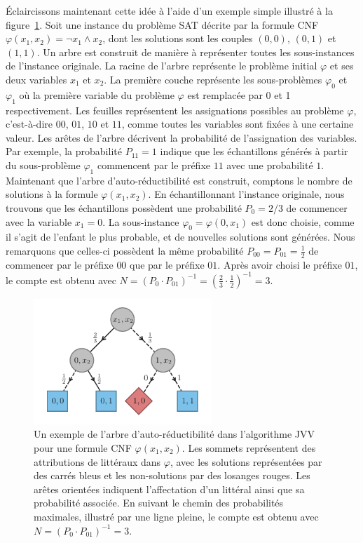 Éclaircissons maintenant cette idée à l'aide d'un exemple simple illustré à la figure~\ref{fig:algorithme-jvv}. Soit une instance du problème SAT décrite par la formule CNF $\varphi(x_{1}, x_{2}) = \neg x_{1} \land x_{2}$, dont les solutions sont les couples $(0,0)$, $(0,1)$ et $(1,1)$. Un arbre est construit de manière à représenter toutes les sous-instances de l'instance originale. La racine de l'arbre représente le problème initial $\varphi$ et ses deux variables $x_{1}$ et $x_{2}$. La première couche représente les sous-problèmes $\varphi_{0}$ et $\varphi_{1}$ où la première variable du problème $\varphi$ est remplacée par 0 et 1 respectivement. Les feuilles représentent les assignations possibles au problème $\varphi$, c'est-à-dire $00$, $01$, $10$ et $11$, comme toutes les variables sont fixées à une certaine valeur. Les arêtes de l'arbre décrivent la probabilité de l'assignation des variables. Par exemple, la probabilité $P_{11}=1$ indique que les échantillons générés à partir du sous-problème $\varphi_{1}$ commencent par le préfixe $11$ avec une probabilité $1$. Maintenant que l'arbre d'auto-réductibilité est construit, comptons le nombre de solutions à la formule $\varphi(x_{1}, x_{2})$. En échantillonnant l'instance originale, nous trouvons que les échantillons possèdent une probabilité $P_{0}=2/3$ de commencer avec la variable $x_{1} = 0$. La sous-instance $\varphi_{0} = \varphi(0, x_{1})$ est donc choisie, comme il s'agit de l'enfant le plus probable, et de nouvelles solutions sont générées. Nous remarquons que celles-ci possèdent la même probabilité $P_{00} = P_{01} =\frac{1}{2}$ de commencer par le préfixe $00$ que par le préfixe $01$. Après avoir choisi le préfixe $01$, le compte est obtenu avec $N = (P_{0} \cdot P_{01})^{-1} = (\frac{2}{3} \cdot \frac{1}{2})^{-1} = 3$.

\begin{figure}[h]
    \centering
    \includegraphics[width=0.6\textwidth]{figures/jvv-algorithm.pdf}
    \caption[Algorithme de Jerrum-Valiant-Vazirani]{Un exemple de l'arbre d'auto-réductibilité dans l'algorithme JVV pour une formule CNF $\varphi(x_{1}, x_{2})$. Les sommets représentent des attributions de littéraux dans $\varphi$, avec les solutions représentées par des carrés bleus et les non-solutions par des losanges rouges. Les arêtes orientées indiquent l'affectation d'un littéral ainsi que sa probabilité associée. En suivant le chemin des probabilités maximales, illustré par une ligne pleine, le compte est obtenu avec $N = (P_{0} \cdot P_{01})^{-1} = 3$.}
    \label{fig:algorithme-jvv}
\end{figure}

